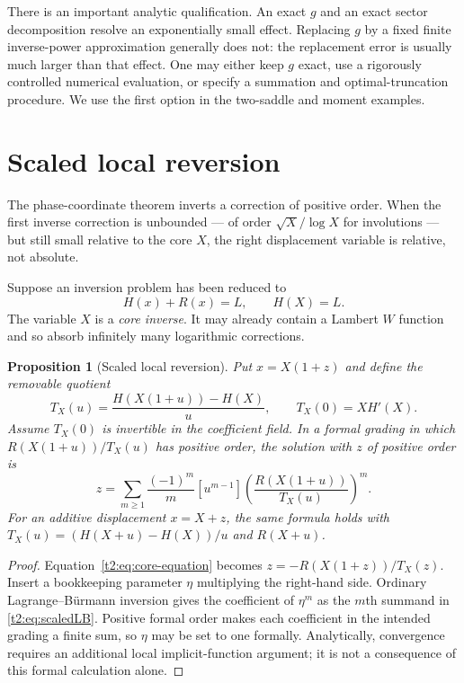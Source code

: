 \documentclass[11pt,openany]{book}
\numberwithin{equation}{chapter}
\theoremstyle{plain}
\newtheorem{proposition}[theorem]{Proposition}
\theoremstyle{definition}
\theoremstyle{remark}
\begin{document}
There is an important analytic qualification. An exact $g$ and an exact sector decomposition resolve an exponentially small effect. Replacing $g$ by a fixed finite inverse-power approximation generally does not: the replacement error is usually much larger than that effect. One may either keep $g$ exact, use a rigorously controlled numerical evaluation, or specify a summation and optimal-truncation procedure. We use the first option in the two-saddle and moment examples.

\section{Scaled local reversion}
\label{ct:sec:scaled}

The phase-coordinate theorem inverts a correction of positive order.  When
the first inverse correction is unbounded --- of order $\sqrt X/\log X$ for
involutions --- but still small relative to the core $X$, the right
displacement variable is relative, not absolute.

Suppose an inversion problem has been reduced to
\begin{equation}
 H(x)+R(x)=L,\qquad H(X)=L.
 \label{t2:eq:core-equation}
\end{equation}
The variable $X$ is a \emph{core inverse}. It may already contain a Lambert $W$ function and so absorb infinitely many logarithmic corrections.

\begin{proposition}[Scaled local reversion]
\label{t2:prop:scaled}
Put $x=X(1+z)$ and define the removable quotient
\[
 T_X(u)=\frac{H(X(1+u))-H(X)}{u},\qquad T_X(0)=XH'(X).
\]
Assume $T_X(0)$ is invertible in the coefficient field. In a formal grading in which $R(X(1+u))/T_X(u)$ has positive order, the solution with $z$ of positive order is
\begin{equation}
 z=\sum_{m\ge1}\frac{(-1)^m}{m}
 [u^{m-1}]\left(\frac{R(X(1+u))}{T_X(u)}\right)^m.
 \label{t2:eq:scaledLB}
\end{equation}
For an additive displacement $x=X+z$, the same formula holds with
$T_X(u)=(H(X+u)-H(X))/u$ and $R(X+u)$.
\end{proposition}
\begin{proof}
Equation~\eqref{t2:eq:core-equation} becomes
$z=-R(X(1+z))/T_X(z)$. Insert a bookkeeping parameter $\eta$ multiplying the right-hand side. Ordinary Lagrange--B\"urmann inversion gives the coefficient of $\eta^m$ as the $m$th summand in \eqref{t2:eq:scaledLB}. Positive formal order makes each coefficient in the intended grading a finite sum, so $\eta$ may be set to one formally. Analytically, convergence requires an additional local implicit-function argument; it is not a consequence of this formal calculation alone.
\end{proof}
\end{document}
